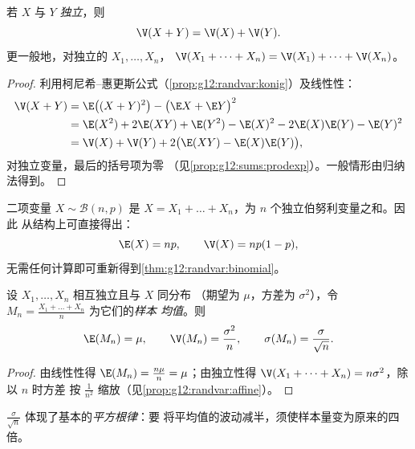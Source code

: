 \begin{theorem}[和的方差]\label{thm:g12:sums:variance}
若 $X$ 与 $Y$ \emph{独立}，则
\[
\V(X + Y) = \V(X) + \V(Y).
\]
更一般地，对独立的 $X_1, \dots, X_n$，
$\V(X_1 + \dots + X_n) = \V(X_1) + \dots + \V(X_n)$。
\end{theorem}

\begin{proof}
利用柯尼希–惠更斯公式（\cref{prop:g12:randvar:konig}）及线性性：
\begin{align*}
\V(X + Y) &= \E\bigl((X+Y)^2\bigr) - \bigl(\E X + \E Y\bigr)^2\\
&= \E(X^2) + 2\E(XY) + \E(Y^2)
- \E(X)^2 - 2\E(X)\E(Y) - \E(Y)^2\\
&= \V(X) + \V(Y) + 2\bigl(\E(XY) - \E(X)\E(Y)\bigr),
\end{align*}
对独立变量，最后的括号项为零
（见\cref{prop:g12:sums:prodexp}）。一般情形由归纳法得到。
\end{proof}

\begin{example}[二项分布再探]\label{ex:g12:sums:binomial}
二项变量 $X \sim \mathcal B(n, p)$ 是
$X = X_1 + \dots + X_n$，为 $n$ 个独立伯努利变量之和。因此
从结构上可直接得出：
\[
\E(X) = np, \qquad \V(X) = np(1-p),
\]
无需任何计算即可重新得到\cref{thm:g12:randvar:binomial}。
\end{example}

\begin{proposition}[样本均值]\label{prop:g12:sums:mean}
设 $X_1, \dots, X_n$ 相互独立且与 $X$ 同分布
（期望为 $\mu$，方差为 $\sigma^2$），令
$M_n = \frac{X_1 + \dots + X_n}{n}$ 为它们的\emph{样本
均值}。则
\[
\E(M_n) = \mu, \qquad \V(M_n) = \frac{\sigma^2}{n}, \qquad
\sigma(M_n) = \frac{\sigma}{\sqrt n}.
\]
\end{proposition}

\begin{proof}
由线性性得 $\E(M_n) = \frac{n\mu}{n} = \mu$；由独立性得
$\V(X_1 + \dots + X_n) = n\sigma^2$，除以 $n$ 时方差
按 $\frac{1}{n^2}$ 缩放（见\cref{prop:g12:randvar:affine}）。
\end{proof}

$\frac{\sigma}{\sqrt n}$ 体现了基本的\emph{平方根律}：要
将平均值的波动减半，须使样本量变为原来的四倍。

